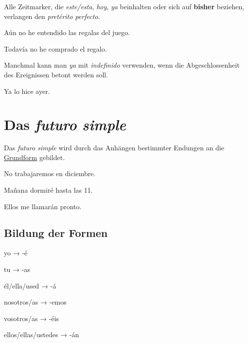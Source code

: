 Alle Zeitmarker, die \textit{este/esta}, \textit{hoy}, \textit{ya}
beinhalten oder sich auf \textbf{bisher} beziehen, verlangen
den \textit{pret\'erito perfecto}.
\begin{ejemplos}
    \item A\'un no he entendido las regalas del juego.
    \item Todav\'ia no he comprado el regalo.
\end{ejemplos}
Manchmal kann man \textit{ya} mit \textit{indefinido} verwenden,
wenn die Abgeschlossenheit des Ereignissen betont werden soll.
\begin{ejemplos}
    \item Ya lo hice ayer.
\end{ejemplos} 
\section{Das \textit{futuro simple}}
Das \textit{futuro simple} wird durch das Anhängen bestimmter 
Endungen an die \underline{Grundform} gebildet.
\begin{ejemplos}
    \item No trabajaremos en diciembre.
    \item Ma\~nana dormir\'e hasta las 11.
    \item Ellos me llamar\'an pronto.
\end{ejemplos}
\subsection*{Bildung der Formen}
\begin{gramatica}
    \item yo → -\'e
    \item tu → -as
    \item \'el/ella/used → -\'a
    \item nosotros/as → -emos
    \item vosotros/as → -\'eis
    \item ellos/ellas/ustedes → -\'an
\end{gramatica}
